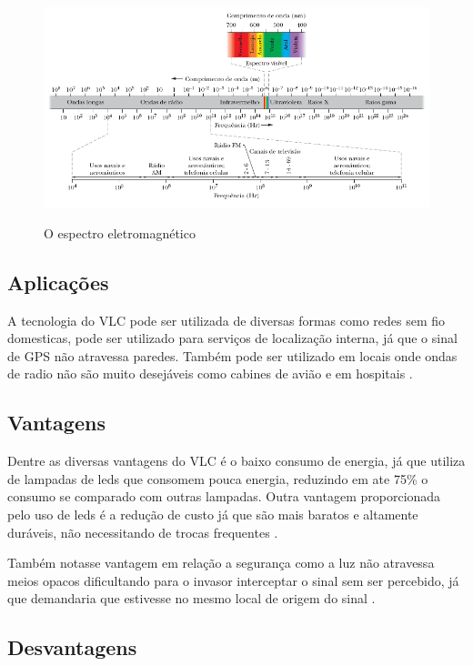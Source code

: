 \begin{figure}[!htbp]
  \caption{O espectro eletromagnético}
  \includegraphics[scale=0.65]{images/espectro_eletromagnetico.png}
  \label{fig:espectro_eletromagnetico}
\end{figure}

\subsection{Aplicações}

A tecnologia do VLC pode ser utilizada de diversas formas como redes sem fio domesticas, pode ser utilizado para serviços de localização interna, já que o sinal de GPS não atravessa paredes. Também pode ser utilizado em locais onde ondas de radio não são muito desejáveis como cabines de avião e em hospitais \cite{matheus2017comunicaccao}. 

\subsection{Vantagens}

Dentre as diversas vantagens do VLC é o baixo consumo de energia, já que utiliza de lampadas de leds que consomem pouca energia, reduzindo em ate 75\% o consumo se comparado com outras lampadas. Outra vantagem proporcionada pelo uso de leds é a redução de custo já que são mais baratos e altamente duráveis, não necessitando de trocas frequentes \cite{matheus2017comunicaccao}.

Também notasse vantagem em relação a segurança como a luz não atravessa meios opacos dificultando para o invasor interceptar o sinal sem ser percebido, já que demandaria que estivesse no mesmo local de origem do sinal \cite{conceiccao2015comunicaccao}.

\subsection{Desvantagens}

